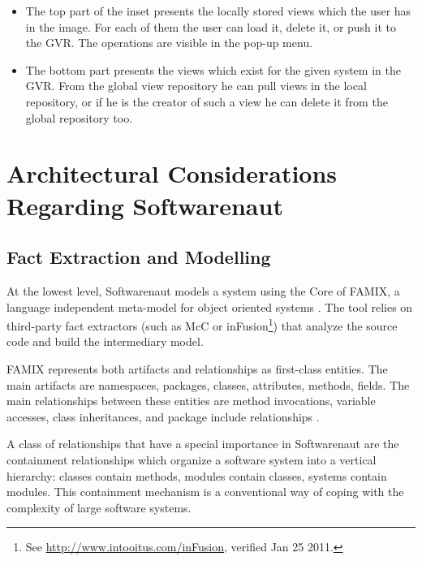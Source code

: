 \documentclass[preprint,12pt]{elsarticle}
\newcommand\on[1]{\nbc{ON}{#1}{red}} %
\begin{document}
\begin{itemize}

\item The top part of the inset presents the locally stored views which the user has in the image. For each of them the user can load it, delete it, or push it to the GVR. The operations are visible in the pop-up menu. %

\item The bottom part presents the views which exist for the given system in the GVR. From the global view repository he can pull views in the local repository, or if he is the creator of such a view he can delete it from the global repository too. 

\end{itemize}


\section {Architectural Considerations Regarding Softwarenaut} 

\on{strange section heading}

\subsection {Fact Extraction and Modelling} \label{sec:facts}

At the lowest level, Softwarenaut models a system using the Core of FAMIX, a language independent meta-model for object oriented systems \cite{tichelaar-thesis}. The tool relies on third-party fact extractors (such as McC \cite{pepi-mcc} or inFusion\footnote{See \url{http://www.intooitus.com/inFusion}, verified Jan 25 2011.}) that analyze the source code and build the intermediary model.

FAMIX represents both artifacts and relationships as first-class entities. The main artifacts are namespaces, packages, classes, attributes, methods, fields. The main relationships between these entities are method invocations, variable accesses, class inheritances, and package include relationships \cite{tichelaar-thesis}.

A class of relationships that have a special importance in Softwarenaut are the containment relationships which organize a software system into a vertical hierarchy: classes contain methods, modules contain classes, systems contain modules. This containment mechanism is a {conventional} way of coping with the complexity of large software systems.
\end{document}
